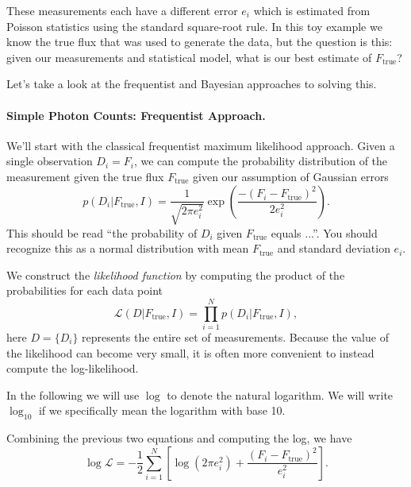 \documentclass[%
oneside,                 %
final,                   %
10pt]{article}
\newenvironment{notice_mdfboxadmon}[1][]{
\begin{notice_mdfboxmdframed}[frametitle=#1]
}
{
\end{notice_mdfboxmdframed}
}
\begin{document}
These measurements each have a different error $e_i$ which is estimated from Poisson statistics using the standard square-root rule. In this toy example we know the true flux that was used to generate the data, but the question is this: given our measurements and statistical model, what is our best estimate of $F_\mathrm{true}$?

Let's take a look at the frequentist and Bayesian approaches to solving this.

\paragraph{Simple Photon Counts: Frequentist Approach.}
We'll start with the classical frequentist maximum likelihood approach. Given a single observation $D_i = F_i$, we can compute the probability distribution of the measurement given the true flux $F_\mathrm{true}$ given our assumption of Gaussian errors
\begin{equation}
p(D_i | F_\mathrm{true}, I) = \frac{1}{\sqrt{2\pi e_i^2}} \exp \left( \frac{-(F_i-F_\mathrm{true})^2}{2e_i^2} \right).
\end{equation}
This should be read ``the probability of $D_i$ given $F_\mathrm{true}$
equals ...''. You should recognize this as a normal distribution with mean $F_\mathrm{true}$ and standard deviation $e_i$.

We construct the \emph{likelihood function} by computing the product of the probabilities for each data point
\begin{equation}
\mathcal{L}(D | F_\mathrm{true}, I) = \prod_{i=1}^N p(D_i | F_\mathrm{true}, I),
\end{equation}
here $D = \{D_i\}$ represents the entire set of measurements. Because the value of the likelihood can become very small, it is often more convenient to instead compute the log-likelihood. 


\begin{notice_mdfboxadmon}[Notice]
In the following we will use $\log$ to denote the natural logarithm. We will write $\log_{10}$ if we specifically mean the logarithm with base 10.
\end{notice_mdfboxadmon} %



Combining the previous two equations and computing the log, we have
\begin{equation}
\log\mathcal{L} = -\frac{1}{2} \sum_{i=1}^N \left[ \log(2\pi e_i^2) +  \frac{(F_i-F_\mathrm{true})^2}{e_i^2} \right].
\end{equation}
\end{document}
